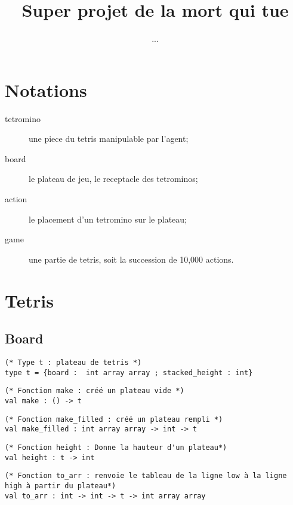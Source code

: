 \documentclass{article}
\title{Super projet de la mort qui tue}
\author{...}
\begin{document}
\maketitle
\lstset{language=Caml}

\section{Notations}
\begin{description}
  \item[tetromino] une piece du tetris manipulable par l'agent;
  \item[board] le plateau de jeu, le receptacle des tetrominos;
  \item[action] le placement d'un tetromino sur le plateau;
  \item[game] une partie de tetris, soit la succession de 10,000 actions.
\end{description}

\section{Tetris}

\subsection{Board}

\begin{lstlisting}[frame=L]
(* Type t : plateau de tetris *)
type t = {board :  int array array ; stacked_height : int}
\end{lstlisting}

\begin{lstlisting}[frame=L]
(* Fonction make : créé un plateau vide *)
val make : () -> t
\end{lstlisting}

\begin{lstlisting}[frame=L]
(* Fonction make_filled : créé un plateau rempli *)
val make_filled : int array array -> int -> t
\end{lstlisting}

\begin{lstlisting}[frame=L]
(* Fonction height : Donne la hauteur d'un plateau*)
val height : t -> int
\end{lstlisting}

\begin{lstlisting}[frame=L]
(* Fonction to_arr : renvoie le tableau de la ligne low à la ligne high à partir du plateau*)
val to_arr : int -> int -> t -> int array array
\end{lstlisting}
\end{document}
